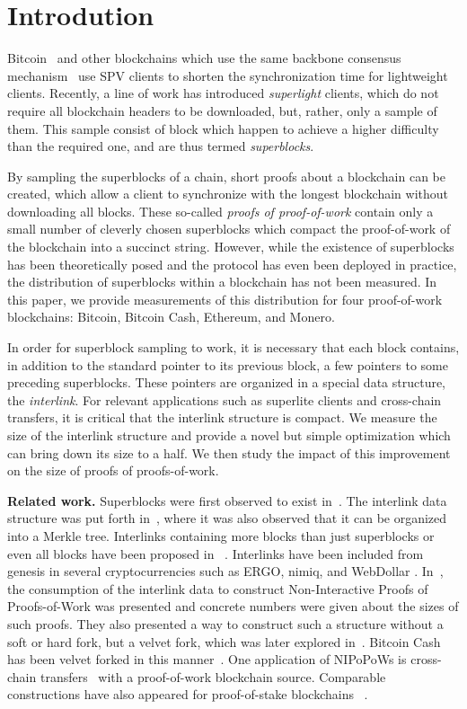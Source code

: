 \section{Introdution}

Bitcoin~\cite{bitcoin} and other blockchains which use the same backbone
consensus mechanism~\cite{EC:GarKiaLeo15} use SPV clients to shorten the
synchronization time for lightweight clients. Recently, a line of work has
introduced \emph{superlight} clients, which do not require all blockchain
headers to be downloaded, but, rather, only a sample of them. This sample
consist of block which happen to achieve a higher difficulty than the required
one, and are thus termed \emph{superblocks}.

By sampling the superblocks of a chain, short proofs about a blockchain can be
created, which allow a client to synchronize with the longest blockchain without
downloading all blocks. These so-called \emph{proofs of proof-of-work} contain
only a small number of cleverly chosen superblocks which compact the
proof-of-work of the blockchain into a succinct string. However, while the
existence of superblocks has been theoretically posed and the protocol has even
been deployed in practice, the distribution of superblocks within a blockchain
has not been measured. In this paper, we provide measurements of this
distribution for four proof-of-work blockchains: Bitcoin, Bitcoin Cash,
Ethereum, and Monero.

In order for superblock sampling to work, it is necessary that each block
contains, in addition to the standard pointer to its previous block, a few
pointers to some preceding superblocks. These pointers are organized in a
special data structure, the \emph{interlink}. For relevant applications such as
superlite clients and cross-chain transfers, it is critical that the interlink
structure is compact. We measure the size of the interlink structure and provide
a novel but simple optimization which can bring down its size to a half. We then
study the impact of this improvement on the size of proofs of proofs-of-work.

\noindent
\textbf{Related work.}
Superblocks were first observed to exist in~\cite{highway}.
The interlink data structure was put forth in~\cite{popow}, where it was also
observed that it can be organized into a Merkle tree. Interlinks containing more
blocks than just superblocks or even all blocks have been
proposed in~\cite{vitalik-eip,flyclient} . Interlinks have
been included from genesis in several cryptocurrencies such as ERGO, nimiq, and
WebDollar . In~\cite{nipopows}, the consumption of the
interlink data to construct Non-Interactive Proofs of Proofs-of-Work was
presented and concrete numbers were given about the sizes of such proofs. They
also presented a way to construct such a structure without a soft or hard fork,
but a velvet fork, which was later explored in~\cite{velvet}. Bitcoin Cash has
been velvet forked in this manner~\cite{gtklocker}. One
application of NIPoPoWs is cross-chain transfers~\cite{pow-sidechains}
 with a proof-of-work blockchain source. Comparable
constructions have also appeared for proof-of-stake
blockchains~\cite{pos-sidechains} .

